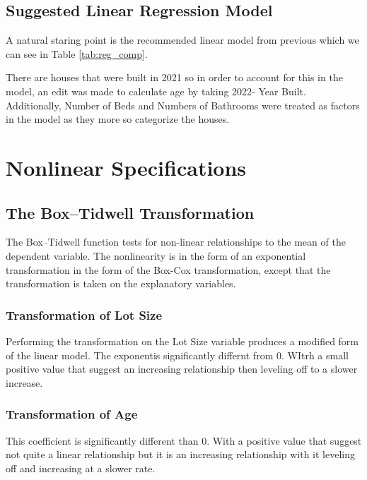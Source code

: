 \subsection{Suggested Linear Regression Model}
A natural staring point is the recommended linear model
from previous which we can see in Table \ref{tab:reg_comp}. 

% 

% 
There are houses that were built in 2021 so in order to account for this in the model, an edit was made to calculate age by taking 2022- Year Built. Additionally, Number of Beds and Numbers of Bathrooms were treated as factors in the model as they more so categorize the houses.
%
\clearpage


\section{Nonlinear Specifications}

\subsection{The Box--Tidwell Transformation}

The Box--Tidwell function tests for non-linear relationships
to the mean of the dependent variable.
The nonlinearity is in the form of an
exponential transformation in the form of the Box-Cox
transformation, except that the transformation is taken
on the explanatory variables.


\subsubsection{Transformation of Lot Size}


Performing the transformation on the Lot Size variable
produces a modified form of the linear model. The exponentis significantly differnt from 0. WItrh a small positive value that suggest an increasing relationship then leveling off to a slower increase. 





\subsubsection{Transformation of Age}




This coefficient is significantly different than 0. With a positive value that suggest not quite a linear relationship but it is an increasing relationship with it leveling off and increasing at a slower rate.  

